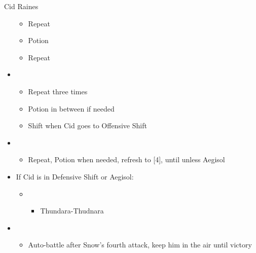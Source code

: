\begin{multicols}{2}
\begin{battle}{Cid Raines}
\begin{itemize}
\begin{itemize}
        \item Repeat
        \item Potion
        \item Repeat
    \end{itemize}
    \item \second
    \begin{itemize}
        \item Repeat three times
        \item Potion in between if needed
        \item Shift when Cid goes to Offensive Shift
    \end{itemize}
    \item \third
    \begin{itemize}
        \item Repeat, Potion when needed, refresh to [4], until \stagger unless Aegisol
    \end{itemize}
    \item If Cid is in Defensive Shift or Aegisol:
    \begin{itemize}
        \item \second
        \begin{itemize}
            \item Thundara-Thudnara
        \end{itemize}
    \end{itemize}
    \item \sixth
    \begin{itemize}
        \item Auto-battle after Snow's fourth attack, keep him in the air until victory
    \end{itemize}
\end{itemize}
\end{battle}


\end{multicols}
